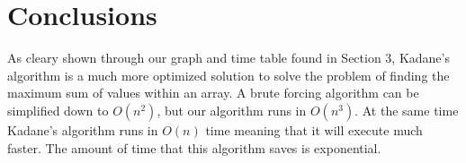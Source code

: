 \documentclass[10pt, letterpaper]{article}
\begin{document}
	\section{Conclusions}
	As cleary shown through our graph and time table found in Section 3,
	Kadane's algorithm is a much more optimized solution to solve the problem of finding the maximum sum of values within an array.
	A brute forcing algorithm can be simplified down to $O(n^2)$, but our algorithm runs in $O(n^3)$.
	At the same time Kadane's algorithm runs in $O(n)$ time meaning that it will execute much faster.
	The amount of time that this algorithm saves is exponential.
	
\end{document}
